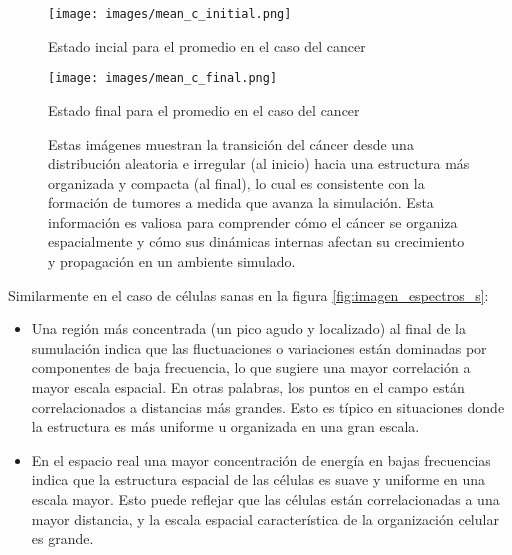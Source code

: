 \documentclass{article}
\begin{document}
\begin{figure}[htbp]
    \centering
    \begin{minipage}[b]{0.45\textwidth}
        \centering
        \texttt{[image: images/mean\_c\_initial.png]}
        \caption{Estado incial para el promedio en el caso del cancer}
        \label{fig:fft_initial}
    \end{minipage}
    \hfill
    \begin{minipage}[b]{0.45\textwidth}
        \centering
        \texttt{[image: images/mean\_c\_final.png]}
        \caption{Estado final para el promedio en el caso del cancer}
        \label{fig:fft_final}
    \end{minipage}
    \caption{Estas imágenes muestran la transición del cáncer desde una distribución aleatoria e irregular (al inicio) hacia una estructura más organizada y compacta (al final), lo cual es consistente con la formación de tumores a medida que avanza la simulación. Esta información es valiosa para comprender cómo el cáncer se organiza espacialmente y cómo sus dinámicas internas afectan su crecimiento y propagación en un ambiente simulado.}
    \label{fig:imagen_espectros}
\end{figure}


Similarmente en el caso de células sanas en la figura \ref{fig:imagen_espectros_s}:


\begin{itemize}
    \item Una región más concentrada (un pico agudo y localizado) al final de la sumulación indica que las fluctuaciones o variaciones están dominadas por componentes de baja frecuencia, lo que sugiere una mayor correlación a mayor escala espacial. En otras palabras, los puntos en el campo están correlacionados a distancias más grandes. Esto es típico en situaciones donde la estructura es más uniforme u organizada en una gran escala.

    \item  En el espacio real una mayor concentración de energía en bajas frecuencias indica que la estructura espacial de las células es suave y uniforme en una escala mayor. Esto puede reflejar que las células están correlacionadas a una mayor distancia, y la escala espacial característica de la organización celular es grande.
\end{itemize}
\end{document}
